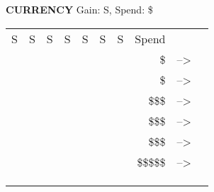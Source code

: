 \begin{flushleft}
  \textbf{CURRENCY} \textcolor{supplemental}{Gain: S, Spend: \$}
\end{flushleft}
\label{currency}
\begin{tabular}{|
>{\columncolor{currency}}l |
>{\columncolor{currency}}l |
>{\columncolor{currency}}l |
>{\columncolor{currency}}l |
>{\columncolor{currency}}l |
>{\columncolor{currency}}l |
>{\columncolor{currency}}l |
r c l} \hhline{-------}
{S} &
  {S} &
  {S} &
  {\color{currency} S} &
  {\color{currency} S} &
  {\color{currency} S} &
  {\color{currency} S} &
  Spend & & \color{supplemental}{Gain} \\ \hhline{-------}
{\color{supplemental}} &
  {\color{supplemental}} &
  {\color{supplemental}} &
  {\color{supplemental}} &
  {\color{supplemental}} &
  {\color{supplemental}} &
  {\color{supplemental}} &
  \$ & --\textgreater{} & \color{supplemental}{die +-1} \\ \hhline{-------}
{\color{supplemental}} &
  {\color{supplemental}} &
  {\color{supplemental}} &
  {\color{supplemental}} &
  {\color{supplemental}} &
  {\color{supplemental}} &
  {\color{supplemental}} &
  \$ & --\textgreater{} & \color{supplemental}{/} \\ \hhline{-------}
{\color{supplemental}} &
  {\color{supplemental}} &
  {\color{supplemental}} &
  {\color{supplemental}} &
  {\color{supplemental}} &
  {\color{supplemental}} &
  {\color{supplemental}} &
  \$\$\$ & --\textgreater{} & \color{supplemental}{T} \\ \hhline{-------}
{\color{supplemental}} &
  {\color{supplemental}} &
  {\color{supplemental}} &
  {\color{supplemental}} &
  {\color{supplemental}} &
  {\color{supplemental}} &
  {\color{supplemental}} &
  \$\$\$ & --\textgreater{} & \color{supplemental}{C} \\ \hhline{-------}
{\color{supplemental}} &
  {\color{supplemental}} &
  {\color{supplemental}} &
  {\color{supplemental}} &
  {\color{supplemental}} &
  {\color{supplemental}} &
  {\color{supplemental}} &
  \$\$\$ & --\textgreater{} & \color{supplemental}{M} \\ \hhline{-------}
{\color{supplemental}} &
  {\color{supplemental}} &
  {\color{supplemental}} &
  {\color{supplemental}} &
  {\color{supplemental}} &
  {\color{supplemental}} &
  {\color{supplemental}} &
  \$\$\$\$\$ & --\textgreater{} & \color{supplemental}{:)} \\ \hhline{-------}
{\color{supplemental}} &
  {\color{supplemental}} &
  {\color{supplemental}} &
  {\color{supplemental}} &
  {\color{supplemental}} &
  {\color{supplemental}} &
  {\color{supplemental}} & & & \\ \hhline{-------}
{\color{supplemental}} &
  {\color{supplemental}} &
  {\color{supplemental}} &
  {\color{supplemental}} &
  {\color{supplemental}} &
  {\color{supplemental}} &
  {\color{supplemental}{!}} & & & \\ \hhline{-------}
\end{tabular}
